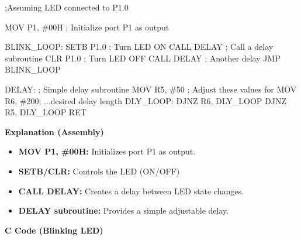 \documentclass[
]{article}
\newenvironment{Shaded}{}{}
\newcommand{\NormalTok}[1]{#1}
\begin{document}
\begin{Shaded}
\begin{Highlighting}[]
\NormalTok{;Assuming LED connected to P1.0}

\NormalTok{MOV P1, \#00H    ; Initialize port P1 as output}

\NormalTok{BLINK\_LOOP:}
\NormalTok{    SETB P1.0   ; Turn LED ON}
\NormalTok{    CALL DELAY  ; Call a delay subroutine}
\NormalTok{    CLR P1.0    ; Turn LED OFF}
\NormalTok{    CALL DELAY  ; Another delay}
\NormalTok{    JMP BLINK\_LOOP}

\NormalTok{DELAY:          ; Simple delay subroutine}
\NormalTok{    MOV R5, \#50 ; Adjust these values for}
\NormalTok{    MOV R6, \#200; ...desired delay length}
\NormalTok{DLY\_LOOP:}
\NormalTok{    DJNZ R6, DLY\_LOOP}
\NormalTok{    DJNZ R5, DLY\_LOOP}
\NormalTok{    RET}
\end{Highlighting}
\end{Shaded}

\textbf{Explanation (Assembly)}

\begin{itemize}
\item
  \textbf{MOV P1, \#00H:} Initializes port P1 as output.
\item
  \textbf{SETB/CLR:} Controls the LED (ON/OFF)
\item
  \textbf{CALL DELAY:} Creates a delay between LED state changes.
\item
  \textbf{DELAY subroutine:} Provides a simple adjustable delay.
\end{itemize}

\textbf{C Code (Blinking LED)}
\end{document}

